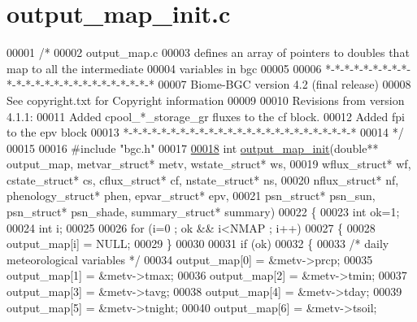 \hypertarget{output__map__init_8c_source}{}\section{output\+\_\+map\+\_\+init.\+c}
\label{output__map__init_8c_source}

\begin{DoxyCode}
00001 \textcolor{comment}{/*}
00002 \textcolor{comment}{output\_map.c}
00003 \textcolor{comment}{defines an array of pointers to doubles that map to all the intermediate}
00004 \textcolor{comment}{variables in bgc}
00005 \textcolor{comment}{}
00006 \textcolor{comment}{*-*-*-*-*-*-*-*-*-*-*-*-*-*-*-*-*-*-*-*-*-*-*-*-*}
00007 \textcolor{comment}{Biome-BGC version 4.2 (final release)}
00008 \textcolor{comment}{See copyright.txt for Copyright information}
00009 \textcolor{comment}{}
00010 \textcolor{comment}{Revisions from version 4.1.1:}
00011 \textcolor{comment}{Added cpool\_*\_storage\_gr fluxes to the cf block.}
00012 \textcolor{comment}{Added fpi to the epv block}
00013 \textcolor{comment}{*-*-*-*-*-*-*-*-*-*-*-*-*-*-*-*-*-*-*-*-*-*-*-*-*}
00014 \textcolor{comment}{*/}
00015 
00016 \textcolor{preprocessor}{#include "bgc.h"}
00017 
\hypertarget{output__map__init_8c_source_l00018}{}\hyperlink{output__map__init_8c_aecdfe7c08babe362b34e23a5488eae09}{00018} \textcolor{keywordtype}{int} \hyperlink{output__map__init_8c_aecdfe7c08babe362b34e23a5488eae09}{output\_map\_init}(\textcolor{keywordtype}{double}** output\_map, metvar\_struct* metv, wstate\_struct* ws,
00019 wflux\_struct* wf, cstate\_struct* cs, cflux\_struct* cf, nstate\_struct* ns,
00020 nflux\_struct* nf, phenology\_struct* phen, epvar\_struct* epv,
00021 psn\_struct* psn\_sun, psn\_struct* psn\_shade, summary\_struct* summary)
00022 \{
00023     \textcolor{keywordtype}{int} ok=1;
00024     \textcolor{keywordtype}{int} i;
00025     
00026     \textcolor{keywordflow}{for} (i=0 ; ok && i<NMAP ; i++)
00027     \{
00028         output\_map[i] = NULL;
00029     \}
00030     
00031     \textcolor{keywordflow}{if} (ok)
00032     \{
00033         \textcolor{comment}{/* daily meteorological variables */}
00034         output\_map[0] = &metv->prcp;
00035         output\_map[1] = &metv->tmax;
00036         output\_map[2] = &metv->tmin;
00037         output\_map[3] = &metv->tavg;
00038         output\_map[4] = &metv->tday;
00039         output\_map[5] = &metv->tnight;
00040         output\_map[6] = &metv->tsoil;

\end{DoxyCode}

